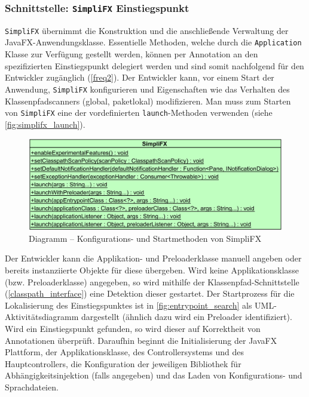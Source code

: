 \subsubsection{Schnittstelle: \texttt{SimpliFX} Einstiegspunkt}
\texttt{SimpliFX} übernimmt die Konstruktion und die anschließende Verwaltung der JavaFX-Anwendungsklasse. Essentielle Methoden, welche durch die \texttt{Application} Klasse zur Verfügung gestellt werden, können per Annotation an den spezifizierten Einstiegspunkt delegiert werden und sind somit nachfolgend für den Entwickler zugänglich (\autoref{freq2}). Der Entwickler kann, vor einem Start der Anwendung, \texttt{SimpliFX} konfigurieren und Eigenschaften wie das Verhalten des Klassenpfadscanners (global, paketlokal) modifizieren. Man muss zum Starten von \texttt{SimpliFX} eine der vordefinierten \texttt{launch}-Methoden verwenden (siehe \autoref{fig:simplifx_launch}). 
\begin{figure}[H]
	\centering
	\includegraphics[width=\textwidth]{Abbildungen/SimpliFX Einstiegspunkt.png}
	\caption{Diagramm -- Konfigurations- und Startmethoden von SimpliFX}
	\label{fig:simplifx_launch}
\end{figure}
\noindent Der Entwickler kann die Applikation- und Preloaderklasse manuell angeben oder bereits instanziierte Objekte für diese übergeben. Wird keine Applikationsklasse (bzw. Preloaderklasse) angegeben, so wird mithilfe der Klassenpfad-Schnittstelle (\autoref{classpath_interface}) eine Detektion dieser gestartet. Der Startprozess für die Lokalisierung des Einstiegspunktes ist in \autoref{fig:entrypoint_search} als UML-Aktivitätsdiagramm dargestellt (ähnlich dazu wird ein Preloader identifiziert). Wird ein Einstiegspunkt gefunden, so wird dieser auf Korrektheit von Annotationen überprüft. Daraufhin beginnt die Initialisierung der JavaFX Plattform, der Applikationsklasse, des Controllersystems und des Hauptcontrollers, die Konfiguration der jeweiligen Bibliothek für Abhängigkeitsinjektion (falls angegeben) und das Laden von Konfigurations- und Sprachdateien.

